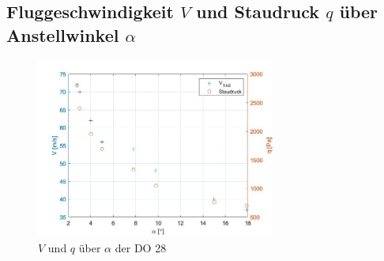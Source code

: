\subsection{Fluggeschwindigkeit $V$ und Staudruck $q$ über Anstellwinkel $\alpha$}

\begin{figure}[H]
	\centering	\includegraphics[width=0.7\textwidth]{./Bilder/V_q_alpha.jpg}
	\caption{$V$ und $q$ über $\alpha$ der DO 28}
	\label{fig:V_q_alpha_DO28}
\end{figure}